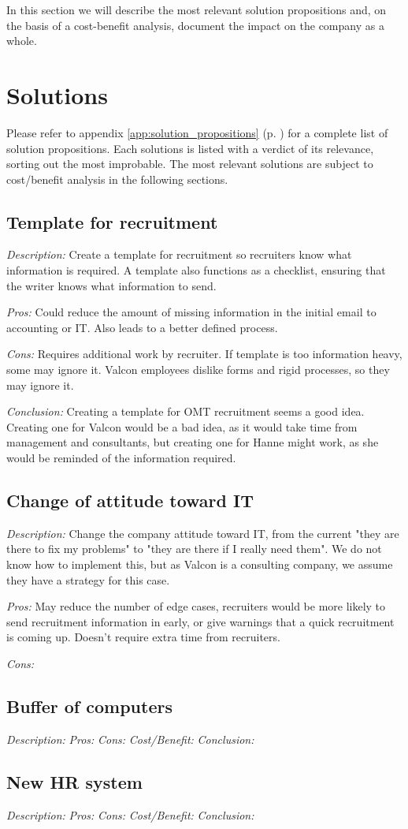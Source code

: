 In this section we will describe the most relevant solution propositions and, on the basis of a cost-benefit analysis, document the impact on the company as a whole.

\section{Solutions}
Please refer to appendix \ref{app:solution_propositions} (p. \pageref{app:solution_propositions}) for a complete list of solution propositions. Each solutions is listed with a verdict of its relevance, sorting out the most improbable.
The most relevant solutions are subject to cost/benefit analysis in the following sections.

\subsection{Template for recruitment}
\emph{Description:} Create a template for recruitment so recruiters know what information is required. A template also functions as a checklist, ensuring that the writer knows what information to send.

\emph{Pros:} Could reduce the amount of missing information in the initial email to accounting or IT. 
Also leads to a better defined process.

\emph{Cons:} Requires additional work by recruiter. 
If template is too information heavy, some may ignore it.
Valcon employees dislike forms and rigid processes, so they may ignore it.

\emph{Conclusion:} Creating a template for OMT recruitment seems a good idea.
Creating one for Valcon would be a bad idea, as it would take time from management and consultants, but creating one for Hanne might work, as she would be reminded of the information required.

\subsection{Change of attitude toward IT}
\emph{Description:} Change the company attitude toward IT, from the current "they are there to fix my problems" to "they are there if I really need them".
We do not know how to implement this, but as Valcon is a consulting company, we assume they have a strategy for this case.

\emph{Pros:} May reduce the number of edge cases, recruiters would be more likely to send recruitment information in early, or give warnings that a quick recruitment is coming up.
Doesn't require extra time from recruiters.

\emph{Cons:} 

\subsection{Buffer of computers}
\emph{Description:}
\emph{Pros:}
\emph{Cons:}
\emph{Cost/Benefit:}
\emph{Conclusion:}

\subsection{New HR system}
\emph{Description:}
\emph{Pros:}
\emph{Cons:}
\emph{Cost/Benefit:}
\emph{Conclusion:}
